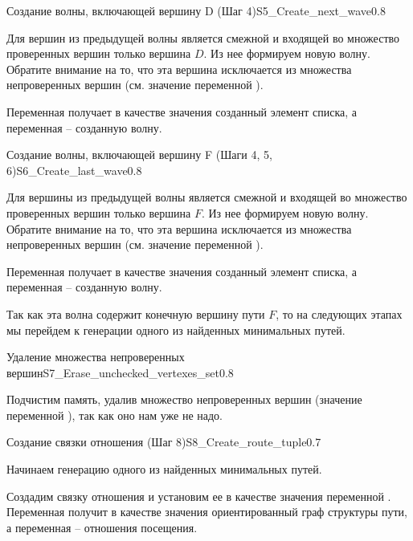 \begin{algostep}{Создание волны, включающей вершину D (Шаг
    4)}{S5_Create_next_wave}{0.8}

  Для вершин из предыдущей волны является смежной и входящей во
  множество проверенных вершин только вершина $D$. Из нее формируем
  новую волну. Обратите внимание на то, что эта вершина исключается из
  множества непроверенных вершин (см. значение переменной
  ).

  Переменная  получает в качестве значения
  созданный элемент списка, а переменная  – созданную
  волну.
\end{algostep}


\begin{algostep}{Создание волны, включающей вершину F (Шаги 4, 5,
    6)}{S6_Create_last_wave}{0.8}

  Для вершины из предыдущей волны является смежной и входящей во
  множество проверенных вершин только вершина $F$. Из нее формируем
  новую волну. Обратите внимание на то, что эта вершина исключается из
  множества непроверенных вершин (см. значение переменной
  ).

  Переменная  получает в качестве значения
  созданный элемент списка, а переменная  – созданную
  волну.

  Так как эта волна содержит конечную вершину пути $F$, то на
  следующих этапах мы перейдем к генерации одного из найденных
  минимальных путей.
\end{algostep}


\begin{algostep}{Удаление множества непроверенных
    вершин}{S7_Erase_unchecked_vertexes_set}{0.8}
 
  Подчистим память, удалив множество непроверенных вершин (значение
  переменной ), так как оно нам уже не
  надо.
\end{algostep}


\begin{algostep}{Создание связки отношения  (Шаг
    8)}{S8_Create_route_tuple}{0.7}
 
  Начинаем генерацию одного из найденных минимальных путей.

  Создадим связку отношения  и установим ее в качестве
  значения переменной . Переменная 
  получит в качестве значения ориентированный граф структуры пути, а
  переменная  – отношения посещения.
\end{algostep}


